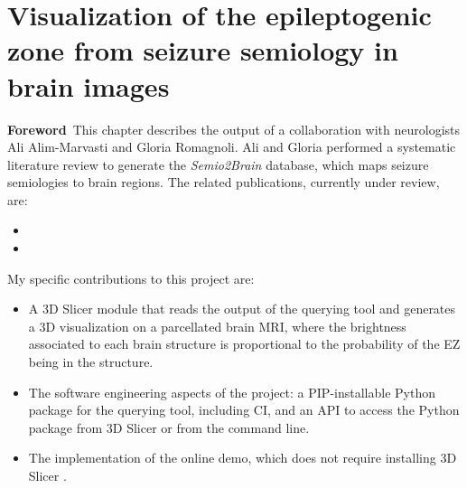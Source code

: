 \chapter[Visualization of the epileptogenic zone in brain images]{Visualization of the epileptogenic zone from seizure semiology in brain images}

\label{chap:svt}
\minitoc

\begin{center}
  \begin{minipage}[b]{0.9\linewidth}
    \small
    \textbf{Foreword\,}
    This chapter describes the output of a collaboration with neurologists Ali Alim-Marvasti and Gloria Romagnoli.
    Ali and Gloria performed a systematic literature review to generate the \textit{Semio2Brain} database, which maps seizure semiologies to brain regions.
    The related publications, currently under review, are:
    \begin{itemize}
      \item {}
      \item {}
    \end{itemize}

    My specific contributions to this project are:
    \begin{itemize}
      \item A 3D Slicer module \cite{fedorov_3d_2012} that reads the output of the querying tool and generates a 3D visualization on a parcellated brain \ac{MRI}, where the brightness associated to each brain structure is proportional to the probability of the \ac{EZ} being in the structure.
      \item The software engineering aspects of the project: a \ac{PIP}-installable Python package for the querying tool, including \ac{CI}, and an \ac{API} to access the Python package from 3D Slicer or from the command line.
      \item The implementation of the online demo, which does not require installing 3D Slicer%
      .
    \end{itemize}

  \end{minipage}
\end{center}

\acresetall
\doublespacing

\onehalfspacing %


